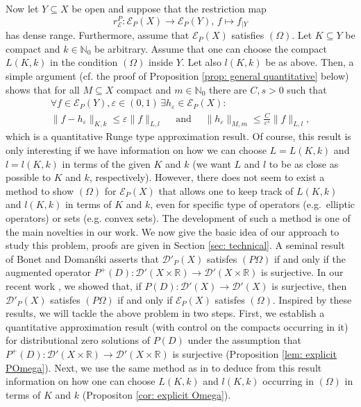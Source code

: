 \documentclass[12pt]{amsart}
\newcommand{\N}{\mathbb{N}}
\newcommand{\R}{\mathbb{R}}
\theoremstyle{definition}
\theoremstyle{remark}
\numberwithin{equation}{section}
\begin{document}
 Now let $Y \subseteq X$ be open and suppose that the restriction map 
\begin{equation}
	\label{restriction}
 r_{\mathscr{E}}^P:\mathscr{E}_P(X)\rightarrow\mathscr{E}_P(Y), \, f \mapsto f_{\mid Y}
\end{equation}
 has dense range. Furthermore, assume that $\mathscr{E}_P(X)$ satisfies $(\Omega)$. Let $K\subseteq Y$ be compact and  $k\in\N_0$ be arbitrary. Assume that one can choose the compact $L(K,k)$ in the condition $(\Omega)$ inside  $Y$.  Let also $l(K,k)$ be as above. Then, a simple argument (cf. the proof of Proposition \ref{prop: general quantitative} below) shows that  for all $M\subseteq X$ compact and  $m\in\N_0$ there are $C,s >0$ such that
 \begin{gather*}
 	\forall f\in\mathscr{E}_P(Y), \varepsilon\in (0,1) \, \exists h_\varepsilon\in\mathscr{E}_P(X):\\
 	\|f-h_\varepsilon\|_{K,k}\leq \varepsilon\|f\|_{L,l} \quad \mbox{ and } \quad \|h_\varepsilon\|_{M,m}\leq\frac{C}{\varepsilon^s}\|f\|_{L,l},
 \end{gather*}
 which is a quantitative Runge type approximation result. Of course, this result is only interesting if we have information on how we can choose $L = L(K,k)$ and $l =l(K,k)$ in terms of the given $K$ and $k$ (we want $L$ and $l$ to be as close as possible to $K$ and $k$, respectively).  However, there does not seem to exist a method to show  $(\Omega)$ for $\mathscr{E}_P(X)$ that allows one to keep track of  $L(K,k)$ and $l(K,k)$ in terms of $K$ and $k$, even for specific type of operators (e.g.\ elliptic operators) or sets (e.g. convex sets).  The development of such a method 
 is one of the main novelties in our work.  We now give the basic idea of our approach to study this problem, proofs are given  in Section \ref{sec: technical}.   A  seminal result of Bonet and Doman\'ski \cite[Proposition 8.1]{B-D2006} asserts that $\mathscr{D}'_P(X)$ satisfes $(P\Omega)$ if and only if the augmented operator $P^+(D): \mathscr{D}'(X\times\R) \to \mathscr{D}'(X\times\R)$ is surjective. In our recent work \cite{DeKa22}, we showed that, if $P(D): \mathscr{D}'(X) \to \mathscr{D}'(X)$ is surjective, then  $\mathscr{D}'_P(X)$ satisfes $(P\Omega)$ if and only if  $\mathscr{E}_P(X)$ satisfes $(\Omega)$. Inspired by these results, we will tackle the above problem in two steps. First, we establish a quantitative approximation result (with control on the compacts occurring in it) for distributional zero solutions of $P(D)$ under the assumption that  $P^+(D): \mathscr{D}'(X\times\R) \to \mathscr{D}'(X\times\R)$ is surjective (Proposition \ref{lem: explicit POmega}). Next, we  use the same method  as in \cite{DeKa22}  to deduce from this result information on how one can choose $L(K,k)$ and $l(K,k)$ occurring in $(\Omega)$ in  terms of $K$ and $k$ (Propositon \ref{cor: explicit Omega}).
\end{document}
